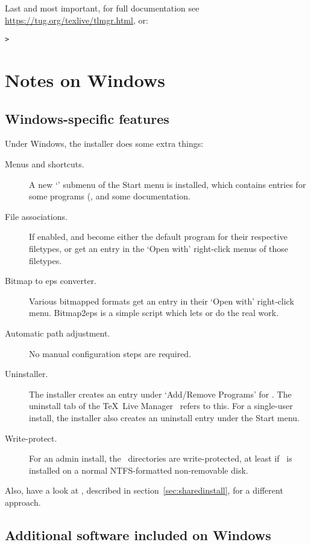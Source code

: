 \documentclass{article}
\begin{document}
Last and most important, for full documentation see
\url{https://tug.org/texlive/tlmgr.html}, or:
\begin{alltt}
> 
\end{alltt}


\section{Notes on Windows}
\label{sec:windows}

\subsection{Windows-specific features}
\label{sec:winfeatures}

Under Windows, the installer does some extra things:
\begin{description}
\item[Menus and shortcuts.] A new `\TL{}' submenu of the
  Start menu is installed, which contains entries for some \GUI{}
  programs (,  and some documentation.
\item[File associations.] If enabled,  and 
  become either the default program for
  their respective filetypes, or get an entry in the `Open with'
  right-click menus of those filetypes.
\item[Bitmap to eps converter.] Various bitmapped formats get an
  entry  in their `Open with' right-click
  menu. Bitmap2eps is a simple script which lets  or
   do the real work.
\item[Automatic path adjustment.] No manual configuration steps are required.
\item[Uninstaller.] The installer creates an entry under `Add/Remove
  Programs' for \TL. The uninstall tab of the \TeX\ Live Manager \GUI\
  refers to this. For a single-user install, the installer also
  creates an uninstall entry under the Start menu.
\item[Write-protect.] For an admin install, the \TL\ directories are
  write-protected, at least if \TL\ is installed on a normal
  NTFS-formatted non-removable disk.
\end{description}

Also, have a look at , described in
section~\ref{sec:sharedinstall}, for a different approach.

\subsection{Additional software included on Windows}
\end{document}
